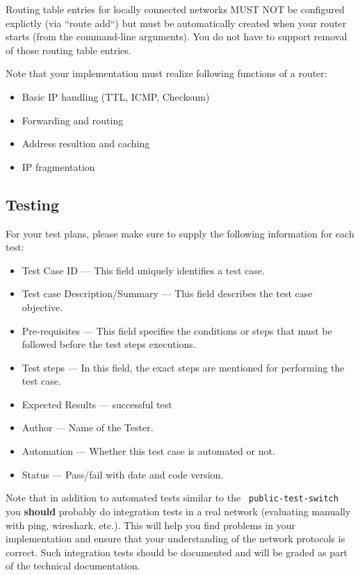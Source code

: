 \documentclass{article}
\begin{document}
Routing table entries for locally connected networks MUST NOT be
configured explictly (via ``route add``) but must be automatically
created when your router starts (from the command-line arguments). You
do not have to support removal of those routing table entries.


Note that your implementation must realize following functions of a
router:

\begin{itemize}
\item Basic IP handling (TTL, ICMP, Checksum) %
\item Forwarding and routing %
\item Address resultion and caching %
\item IP fragmentation %
\end{itemize}


\subsection{Testing}

For your test plans, please make sure to supply the
following information for each test:

\begin{itemize}
  \item Test Case ID --- This field uniquely identifies a test case.
  \item Test case Description/Summary --- This field describes the test case objective.
  \item Pre-requisites --- This field specifies the conditions or steps that must be followed before the test steps executions.
  \item Test steps --- In this field, the exact steps are mentioned for performing the test case.
  \item Expected Results --- successful test
  \item Author --- Name of the Tester.
  \item Automation --- Whether this test case is automated or not.
  \item Status --- Pass/fail with date and code version.
\end{itemize}

Note that in addition to automated tests similar to the {\tt
  public-test-switch} you {\bf should} probably do integration tests
in a real network (evaluating manually with ping, wireshark, etc.).
This will help you find problems in your implementation and ensure
that your understanding of the network protocols is correct. Such
integration tests should be documented and will be graded as part of
the technical documentation.
\end{document}
